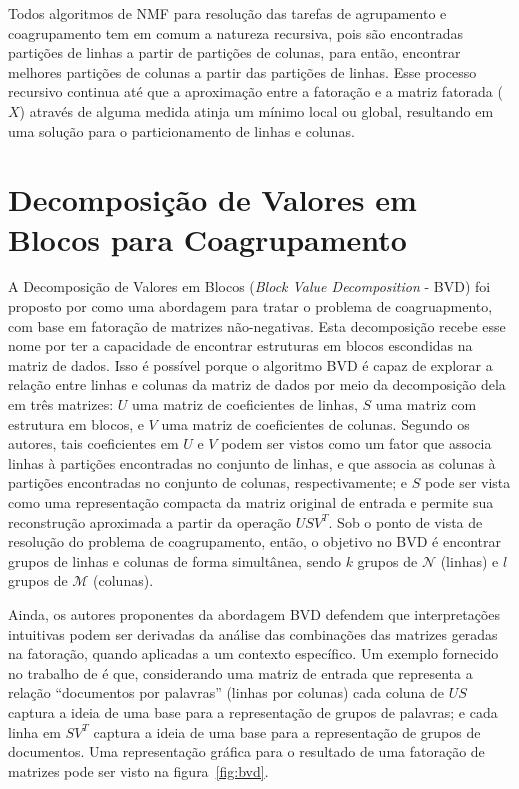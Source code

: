 \documentclass[
    12pt,                %
    oneside,            %
    a4paper,            %
    english,            %
    brazil                %
    ]{abntex2ppgsi}
\begin{document}
Todos algoritmos de NMF para resolução das tarefas de agrupamento e coagrupamento tem em comum a natureza recursiva, pois são encontradas partições de linhas a partir de partições de colunas, para então, encontrar melhores partições de colunas a partir das partições de linhas.
Esse processo recursivo continua até que a aproximação entre a fatoração e a matriz fatorada ($X$) através de alguma medida atinja um mínimo local ou global, resultando em uma solução para o particionamento de linhas e colunas.

\section{Decomposição de Valores em Blocos para Coagrupamento}
\label{sec:bvd}

A Decomposição de Valores em Blocos (\textit{Block Value Decomposition} - BVD) foi proposto por  como uma abordagem para tratar o problema de coagruapmento, com base em fatoração de matrizes não-negativas.
Esta decomposição recebe esse nome por ter a capacidade de encontrar estruturas em blocos escondidas na matriz de dados.
Isso é possível porque o algoritmo BVD é capaz de explorar a relação entre linhas e colunas da matriz de dados por meio da decomposição dela em três matrizes: $U$ uma matriz de coeficientes de linhas, $S$ uma matriz com estrutura em blocos, e $V$ uma matriz de coeficientes de colunas.
Segundo os autores, tais coeficientes em $U$ e $V$ podem ser vistos como um fator que associa linhas à partições encontradas no conjunto de linhas, e que associa as colunas à partições encontradas no conjunto de colunas, respectivamente; e $S$ pode ser vista como uma representação compacta da matriz original de entrada e permite sua reconstrução aproximada a partir da operação $USV^T$.
Sob o ponto de vista de resolução do problema de coagrupamento, então, o objetivo no BVD é encontrar grupos de linhas e colunas de forma simultânea, sendo $k$ grupos de $\mathcal{N}$ (linhas) e $l$ grupos de $\mathcal{M}$ (colunas).

Ainda, os autores proponentes da abordagem BVD defendem que interpretações intuitivas podem ser derivadas da análise das combinações das matrizes geradas na fatoração, quando aplicadas a um contexto específico.
Um exemplo fornecido no trabalho de  é que, considerando uma matriz de entrada que representa a relação ``documentos por palavras'' (linhas por colunas) cada coluna de $US$ captura a ideia de uma base para a representação de grupos de palavras; e cada linha em $SV^T$ captura a ideia de uma base para a representação de grupos de documentos.
Uma representação gráfica para o resultado de uma fatoração de matrizes pode ser visto na figura~\ref{fig:bvd}.
\end{document}
